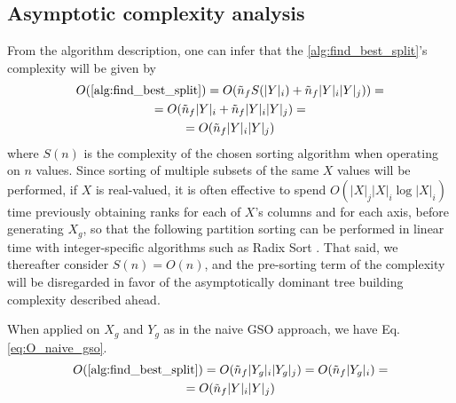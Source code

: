\documentclass[conference]{IEEEtran}
\newcommand{\el}[1]{^{[#1]}}
\newcommand{\angled}[1]{\langle #1 \rangle}
\begin{document}


\subsection{Asymptotic complexity analysis}
\label{sec:complexity_analysis}

From the algorithm description, one can infer that the \ref{alg:find_best_split}'s complexity will be given by
%
\begin{multline}
    O(\ref{alg:find_best_split}) = O(\tilde n_f S(|Y|_i) + \tilde n_f |Y|_i|Y|_j))=\\
    = O(\tilde n_f |Y|_i + \tilde n_f |Y|_i|Y|_j) =\\
    = O(\tilde n_f |Y|_i|Y|_j)
\end{multline}
where $S(n)$ is the complexity of the chosen sorting algorithm when operating on $n$ values. Since sorting of multiple subsets of the same $X$ values will be performed, if $X$ is real-valued, it is often effective to spend $O(|X|_j|X|_i\log |X|_i)$ time previously obtaining ranks for each of $X$'s columns and for each axis, before generating $X_g$, so that the following partition sorting can be performed in linear time with integer-specific algorithms such as Radix Sort \cite{}. That said, we thereafter consider $S(n) = O(n)$, and the pre-sorting term of the complexity will be disregarded in favor of the asymptotically dominant tree building complexity described ahead.

When applied on $X_g$ and $Y_g$ as in the naive GSO approach, we have Eq. \ref{eq:O_naive_gso}.
%
\begin{multline}
    O(\ref{alg:find_best_split}) = O(\tilde n_f |Y_g|_i|Y_g|_j)
    = O(\tilde n_f |Y_g|_i) =\\
    = O(\tilde n_f |Y|_i|Y|_j)
    \label{eq:O_naive_gso}
\end{multline}
\end{document}
